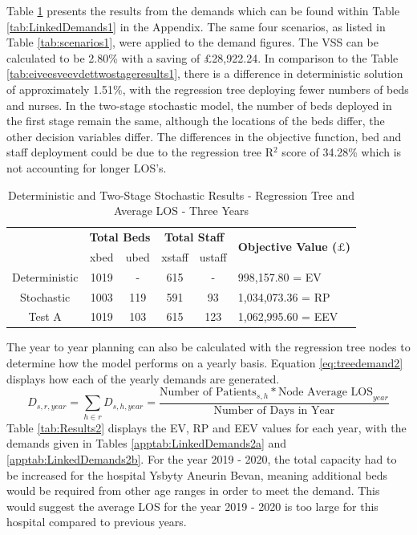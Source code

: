 \documentclass[../thesis.tex]{subfiles}
\begin{document}
Table \ref{tab:Results1} presents the results from the demands which can be found within Table \ref{tab:LinkedDemands1} in the Appendix. The same four scenarios, as listed in Table \ref{tab:scenarios1}, were applied to the demand figures. The VSS can be calculated to be 2.80\% with a saving of $\pounds$28,922.24. In comparison to the Table \ref{tab:eiveesveevdettwostageresults1}, there is a difference in deterministic solution of approximately 1.51\%, with the regression tree deploying fewer numbers of beds and nurses. In the two-stage stochastic model, the number of beds deployed in the first stage remain the same, although the locations of the beds differ, the other decision variables differ. The differences in the objective function, bed and staff deployment could be due to the regression tree R$^{2}$ score of 34.28\% which is not accounting for longer LOS's. 

\begin{table}[h!]
    \centering
    \begin{tabular}{cccccl}\toprule
 & \multicolumn{2}{l}{\textbf{Total Beds}} & \multicolumn{2}{c}{\textbf{Total Staff}} & \multirow{2}{*}{\textbf{Objective Value ($\pounds$)}}\\ \cmidrule(lr){2-3} \cmidrule(lr){4-5}
 & xbed           & ubed          & xstaff         & ustaff         \\ \midrule
    Deterministic      & 1019 & - & 615 & - & 998,157.80 = EV \\ \midrule
    Stochastic &1003& 119& 591 & 93&  1,034,073.36 = RP \\ \midrule
    Test A & 1019 & 103 & 615 & 123 & 1,062,995.60 = EEV \\\bottomrule
    \end{tabular}
    \caption{Deterministic and Two-Stage Stochastic Results - Regression Tree and Average LOS - Three Years}
    \label{tab:Results1}
\end{table}

The year to year planning can also be calculated with the regression tree nodes to determine how the model performs on a yearly basis. Equation \eqref{eq:treedemand2} displays how each of the yearly demands are generated.
\begin{equation}\label{eq:treedemand2}
        D_{s,r,year} = \sum\limits_{h \in r} D_{s,h,year} = \frac{\text{Number of Patients}_{s,h}* {\text{Node Average LOS}}_{year}}{\text{Number of Days in Year}}
\end{equation}
Table \ref{tab:Results2} displays the EV, RP and EEV values for each year, with the demands given in Tables \ref{apptab:LinkedDemands2a} and \ref{apptab:LinkedDemands2b}. For the year 2019 - 2020, the total capacity had to be increased for the hospital Ysbyty Aneurin Bevan, meaning additional beds would be required from other age ranges in order to meet the demand. This would suggest the average LOS for the year 2019 - 2020 is too large for this hospital compared to previous years.
\end{document}
